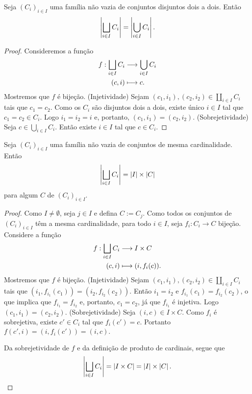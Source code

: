 \begin{prop}
\label{conj:prop.un.dis}
Seja $(C_i)_{i \in I}$ uma família não vazia de conjuntos disjuntos dois a dois. Então
	\begin{equation*}
	\left\vert{\bigsqcup_{i \in I} C_i}\right\vert = \left\vert{\bigcup_{i \in I} C_i}\right\vert.
	\end{equation*}
\end{prop}
\begin{proof}
Consideremos a função
	\begin{align*}
	{f}: {\bigsqcup_{i \in I} C_i} &\longrightarrow {\bigcup_{i \in I} C_i} \\{(c,i)} &\longmapsto {c}.
	\end{align*}
Mostremos que $f$ é bijeção. (Injetividade) Sejam $(c_1,i_1),(c_2,i_2) \in \coprod_{i \in I} C_i$ tais que $c_1=c_2$. Como os $C_i$ são disjuntos dois a dois, existe único $i \in I$ tal que $c_1=c_2 \in C_i$. Logo $i_1=i_2=i$ e, portanto, $(c_1,i_1)=(c_2,i_2)$. (Sobrejetividade) Seja $c \in \bigcup_{i \in I} C_i$. Então existe $i \in I$ tal que $c \in C_i$.
\end{proof}

\begin{prop}
\label{conj:prop.card.un.dis}
Seja $(C_i)_{i \in I}$ uma família não vazia de conjuntos de mesma cardinalidade. Então
	\begin{equation*}
	\left\vert{\bigsqcup_{i \in I} C_i}\right\vert = \left\vert{I}\right\vert \times \left\vert{C}\right\vert
	\end{equation*}
para algum $C$ de $(C_i)_{i \in I}$.
\end{prop}
\begin{proof}
Como $I \neq \emptyset$, seja $j \in I$ e defina $C := C_j$. Como todos os conjuntos de $(C_i)_{i \in I}$ têm a mesma cardinalidade, para todo $i \in I$, seja $f_i: C_i \to C$ bijeção. Considere a função
	\begin{align*}
	{f}: {\bigsqcup_{i \in I} C_i} &\longrightarrow {I \times C} \\{(c,i)} &\longmapsto {(i,f_i(c))}.
	\end{align*}
Mostremos que $f$ é bijeção. (Injetividade) Sejam $(c_1,i_1),(c_2,i_2) \in \coprod_{i \in I} C_i$ tais que $(i_1,f_{i_1}(c_1))=(i_2,f_{i_2}(c_2))$. Então $i_1=i_2$ e $f_{i_1}(c_1)=f_{i_2}(c_2)$, o que implica que $f_{i_1}=f_{i_2}$ e, portanto, $c_1=c_2$, já que $f_{i_1}$ é injetiva. Logo $(c_1,i_1)=(c_2,i_2)$. (Sobrejetividade) Seja $(i,c) \in I \times C$. Como $f_i$ é sobrejetiva, existe $c' \in C_i$ tal que $f_i(c')=c$. Portanto $f(c',i)=(i,f_i(c'))=(i,c)$.

Da sobrejetividade de $f$ e da definição de produto de cardinais, segue que
	\begin{equation*}
	\left\vert{\bigsqcup_{i \in I} C_i}\right\vert = \left\vert{I \times C}\right\vert = \left\vert{I}\right\vert \times \left\vert{C}\right\vert.
	\end{equation*}
\end{proof}

